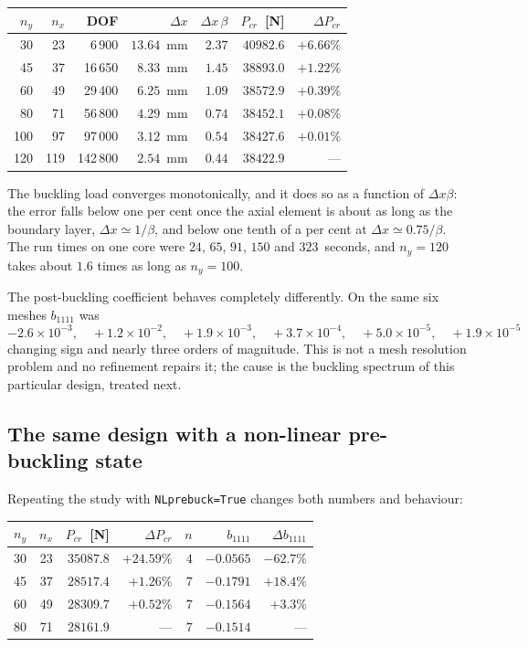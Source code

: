 \documentclass[11pt,a4paper]{article}
\begin{document}
\begin{center}
\begin{tabular}{rrrrrrr}
\toprule
$n_y$ & $n_x$ & DOF & $\Delta x$ & $\Delta x\,\beta$ & $P_{cr}$~[N] &
$\Delta P_{cr}$ \\
\midrule
 30 &  23 &   6\,900 & $13.64$~mm & $2.37$ & $40982.6$ & $+6.66\%$ \\
 45 &  37 &  16\,650 & $ 8.33$~mm & $1.45$ & $38893.0$ & $+1.22\%$ \\
 60 &  49 &  29\,400 & $ 6.25$~mm & $1.09$ & $38572.9$ & $+0.39\%$ \\
 80 &  71 &  56\,800 & $ 4.29$~mm & $0.74$ & $38452.1$ & $+0.08\%$ \\
100 &  97 &  97\,000 & $ 3.12$~mm & $0.54$ & $38427.6$ & $+0.01\%$ \\
120 & 119 & 142\,800 & $ 2.54$~mm & $0.44$ & $38422.9$ & --- \\
\bottomrule
\end{tabular}
\end{center}

The buckling load converges monotonically, and it does so as a function of
$\Delta x\beta$: the error falls below one per cent once the axial element is
about as long as the boundary layer, $\Delta x \simeq 1/\beta$, and below one
tenth of a per cent at $\Delta x \simeq 0.75/\beta$.  The run times on one
core were $24$, $65$, $91$, $150$ and $323$~seconds, and $n_y = 120$ takes
about $1.6$ times as long as $n_y = 100$.

The post-buckling coefficient behaves completely differently.  On the same
six meshes $b_{1111}$ was
\[
  -2.6\times10^{-3},\quad
  +1.2\times10^{-2},\quad
  +1.9\times10^{-3},\quad
  +3.7\times10^{-4},\quad
  +5.0\times10^{-5},\quad
  +1.9\times10^{-5}
\]
changing sign and nearly three orders of magnitude.  This is not a mesh
resolution problem and no refinement repairs it; the cause is the buckling
spectrum of this particular design, treated next.

\subsection{The same design with a non-linear pre-buckling state}
\label{sec:cts-nl}

Repeating the study with \texttt{NLprebuck=True} changes both numbers and
behaviour:

\begin{center}
\begin{tabular}{rrrrrrr}
\toprule
$n_y$ & $n_x$ & $P_{cr}$~[N] & $\Delta P_{cr}$ & $n$ & $b_{1111}$ &
$\Delta b_{1111}$ \\
\midrule
30 & 23 & $35087.8$ & $+24.59\%$ & $4$ & $-0.0565$ & $-62.7\%$ \\
45 & 37 & $28517.4$ & $+1.26\%$  & $7$ & $-0.1791$ & $+18.4\%$ \\
60 & 49 & $28309.7$ & $+0.52\%$  & $7$ & $-0.1564$ & $+3.3\%$ \\
80 & 71 & $28161.9$ & ---        & $7$ & $-0.1514$ & --- \\
\bottomrule
\end{tabular}
\end{center}
\end{document}
